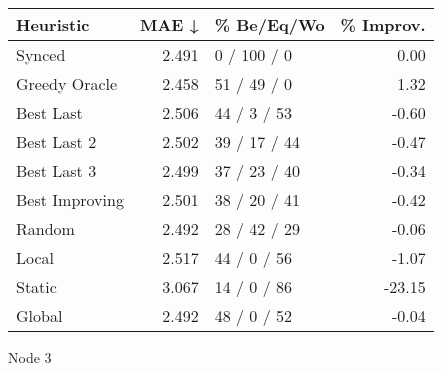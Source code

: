 \begin{tabular}{lrlr}
\toprule
\textbf{Heuristic} & \textbf{MAE ↓} & \textbf{\% Be/Eq/Wo} & \textbf{\% Improv.} \\
\midrule
            Synced &          2.491 &          0 / 100 / 0 &                0.00 \\
     Greedy Oracle &          2.458 &          51 / 49 / 0 &                1.32 \\
         Best Last &          2.506 &          44 / 3 / 53 &               -0.60 \\
       Best Last 2 &          2.502 &         39 / 17 / 44 &               -0.47 \\
       Best Last 3 &          2.499 &         37 / 23 / 40 &               -0.34 \\
    Best Improving &          2.501 &         38 / 20 / 41 &               -0.42 \\
            Random &          2.492 &         28 / 42 / 29 &               -0.06 \\
             Local &          2.517 &          44 / 0 / 56 &               -1.07 \\
            Static &          3.067 &          14 / 0 / 86 &              -23.15 \\
            Global &          2.492 &          48 / 0 / 52 &               -0.04 \\
\bottomrule
\end{tabular}
\caption{Node 3}
\label{tab:hr_iid_lr01_le2_bs4_3}
